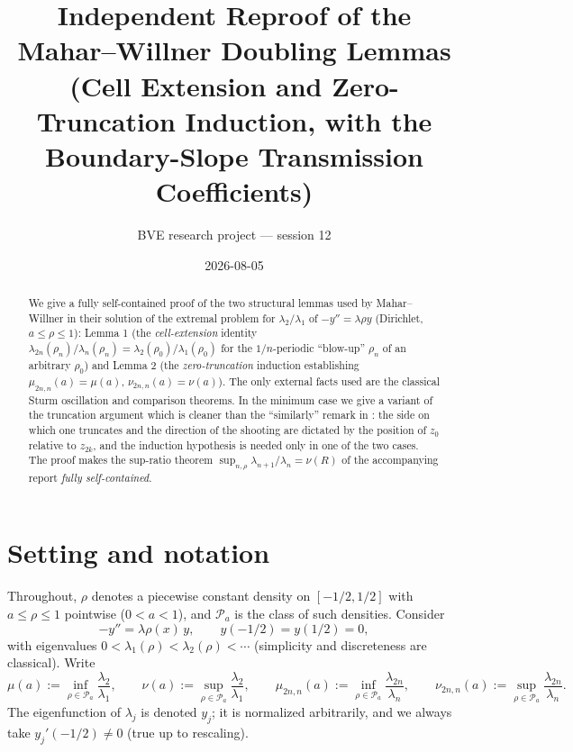﻿\documentclass[11pt]{article}
\title{Independent Reproof of the Mahar--Willner Doubling Lemmas\\ \large (Cell Extension and Zero-Truncation Induction, with the Boundary-Slope Transmission Coefficients)}
\author{BVE research project --- session 12}
\date{2026-08-05}
\begin{document}
\maketitle

\begin{abstract}
We give a fully self-contained proof of the two structural lemmas used by
Mahar--Willner \cite{mw} in their solution of the extremal problem for
$\lambda_2/\lambda_1$ of $-y''=\lambda\rho y$ (Dirichlet, $a\le\rho\le 1$):
Lemma 1 (the \emph{cell-extension} identity
$\lambda_{2n}(\rho_n)/\lambda_n(\rho_n)=\lambda_2(\rho_0)/\lambda_1(\rho_0)$
for the $1/n$-periodic ``blow-up'' $\rho_n$ of an arbitrary $\rho_0$) and
Lemma 2 (the \emph{zero-truncation} induction establishing
$\mu_{2n,n}(a)=\mu(a)$, $\nu_{2n,n}(a)=\nu(a)$).  The only external facts used
are the classical Sturm oscillation and comparison theorems.  In the minimum
case we give a variant of the truncation argument which is cleaner than the
``similarly'' remark in \cite{mw}: the side on which one truncates and the
direction of the shooting are dictated by the position of $z_0$ relative to
$z_{2k}$, and the induction hypothesis is needed only in one of the two cases.
The proof makes the sup-ratio theorem
$\sup_{n,\rho}\lambda_{n+1}/\lambda_n=\nu(R)$ of the accompanying report
\emph{fully self-contained}.
\end{abstract}

\section{Setting and notation}

Throughout, $\rho$ denotes a piecewise constant density on
$[-1/2,1/2]$ with $a\le\rho\le 1$ pointwise ($0<a<1$), and
$\mathcal P_a$ is the class of such densities.  Consider
\begin{equation}
	-y''=\lambda\rho(x)\,y,\qquad y(-1/2)=y(1/2)=0,
	\label{eq:main}
\end{equation}
with eigenvalues $0<\lambda_1(\rho)<\lambda_2(\rho)<\cdots$ (simplicity and
discreteness are classical).  Write
\[
	\mu(a):=\inf_{\rho\in\mathcal P_a}\frac{\lambda_2}{\lambda_1},\qquad
	\nu(a):=\sup_{\rho\in\mathcal P_a}\frac{\lambda_2}{\lambda_1},
	\qquad
	\mu_{2n,n}(a):=\inf_{\rho\in\mathcal P_a}\frac{\lambda_{2n}}{\lambda_n},
	\qquad
	\nu_{2n,n}(a):=\sup_{\rho\in\mathcal P_a}\frac{\lambda_{2n}}{\lambda_n}.
\]
The eigenfunction of $\lambda_j$ is denoted $y_j$; it is normalized
arbitrarily, and we always take $y_j'(-1/2)\neq 0$ (true up to rescaling).
\end{document}
